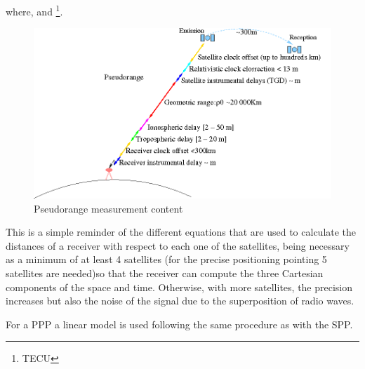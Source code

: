 where,  and \footnote{\ac{TECU}}.\\


\begin{figure}[H]
        \centering
        \includegraphics[scale=0.4]{sources/Figures/ranges.png}
        \caption{Pseudorange measurement content }
        \label{fig:Pseudorange measurement content}
\end{figure}


This is a simple reminder of the different equations that are used to calculate the distances of a receiver with respect to each one of the satellites, being necessary as a minimum of at least 4 satellites (for the precise positioning pointing 5 satellites are needed)so that the receiver can compute the three Cartesian components of the space and time. Otherwise, with more satellites, the precision increases but also the noise of the signal due to the superposition of radio waves.

For a \ac{PPP} a linear model is used following the same procedure as with the \ac{SPP}.

